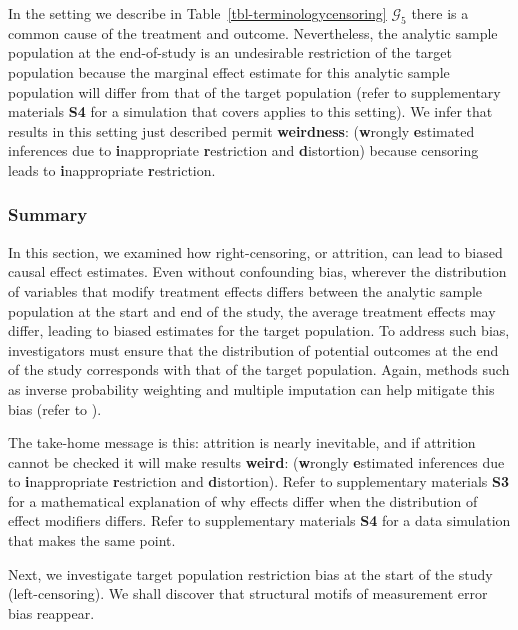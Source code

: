 \documentclass[
  single column]{article}
\begin{document}
In the setting we describe in Table~\ref{tbl-terminologycensoring}
\(\mathcal{G}_5\) there is a common cause of the treatment and outcome.
Nevertheless, the analytic sample population at the end-of-study is an
undesirable restriction of the target population because the marginal
effect estimate for this analytic sample population will differ from
that of the target population (refer to supplementary materials
\textbf{S4} for a simulation that covers applies to this setting). We
infer that results in this setting just described permit
\textbf{weirdness}: (\textbf{w}rongly \textbf{e}stimated inferences due
to \textbf{i}nappropriate \textbf{r}estriction and \textbf{d}istortion)
because censoring leads to \textbf{i}nappropriate \textbf{r}estriction.

\subsubsection{Summary}\label{summary-1}

In this section, we examined how right-censoring, or attrition, can lead
to biased causal effect estimates. Even without confounding bias,
wherever the distribution of variables that modify treatment effects
differs between the analytic sample population at the start and end of
the study, the average treatment effects may differ, leading to biased
estimates for the target population. To address such bias, investigators
must ensure that the distribution of potential outcomes at the end of
the study corresponds with that of the target population. Again, methods
such as inverse probability weighting and multiple imputation can help
mitigate this bias (refer to
).

The take-home message is this: attrition is nearly inevitable, and if
attrition cannot be checked it will make results \textbf{weird}:
(\textbf{w}rongly \textbf{e}stimated inferences due to
\textbf{i}nappropriate \textbf{r}estriction and \textbf{d}istortion).
Refer to supplementary materials \textbf{S3} for a mathematical
explanation of why effects differ when the distribution of effect
modifiers differs. Refer to supplementary materials \textbf{S4} for a
data simulation that makes the same point.

Next, we investigate target population restriction bias at the start of
the study (left-censoring). We shall discover that structural motifs of
measurement error bias reappear.

\newpage{}
\end{document}
